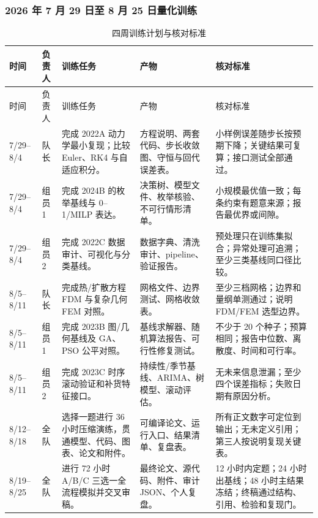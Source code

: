 \subsubsection{2026 年 7 月 29 日至 8 月 25 日量化训练}

\begin{longtable}{p{1.4cm}p{1.55cm}p{3.1cm}p{4.6cm}p{3.4cm}}
\caption{四周训练计划与核对标准}\label{tab:four-weeks}\\
\toprule
时间 & 负责人 & 训练任务 & 产物 & 核对标准\\
\midrule
\endfirsthead
\toprule
时间 & 负责人 & 训练任务 & 产物 & 核对标准\\
\midrule
\endhead
7/29--8/4 & 队长 & 完成 2022A 动力学最小复现；比较 Euler、RK4 与自适应积分。 & 方程说明、两套代码、步长收敛图、守恒与回代误差表。 & 小样例误差随步长按预期下降；关键结果可复算；接口测试全部通过。\\
7/29--8/4 & 组员1 & 完成 2024B 的枚举基线与 0--1/MILP 表达。 & 决策树、模型文件、枚举核验、不可行情形清单。 & 小规模最优值一致；每条约束有题意来源；报告最优界或间隙。\\
7/29--8/4 & 组员2 & 完成 2022C 数据审计、可视化与分类基线。 & 数据字典、清洗审计、pipeline、验证报告。 & 预处理只在训练集拟合；异常处理可追溯；至少三类基线同口径比较。\\
8/5--8/11 & 队长 & 完成热/扩散方程 FDM 与复杂几何 FEM 对照。 & 网格文件、边界测试、网格收敛表。 & 至少三档网格；边界和量纲单测通过；说明 FDM/FEM 选型边界。\\
8/5--8/11 & 组员1 & 完成 2023B 图/几何基线及 GA、PSO 公平对照。 & 基线求解器、随机算法报告、可行性修复测试。 & 不少于 20 个种子；预算相同；报告中位数、离散度、时间和可行率。\\
8/5--8/11 & 组员2 & 完成 2023C 时序滚动验证和补货特征接口。 & 持续性/季节基线、ARIMA、树模型、滚动评估。 & 无未来信息泄漏；至少四个误差指标；失败日期有原因分析。\\
8/12--8/18 & 全队 & 选择一题进行 36 小时压缩演练，贯通模型、代码、图表、论文和附件。 & 可编译论文、运行入口、结果清单、复盘表。 & 所有正文数字可定位到输出；无未定义引用；第三人按说明复现关键表。\\
8/19--8/25 & 全队 & 进行 72 小时 A/B/C 三选一全流程模拟并交叉审稿。 & 最终论文、源代码、附件、审计 JSON、个人复盘。 & 12 小时内定题；24 小时出基线；48 小时主结果冻结；终稿通过结构、引用、检验和复现门。\\
\bottomrule
\end{longtable}

